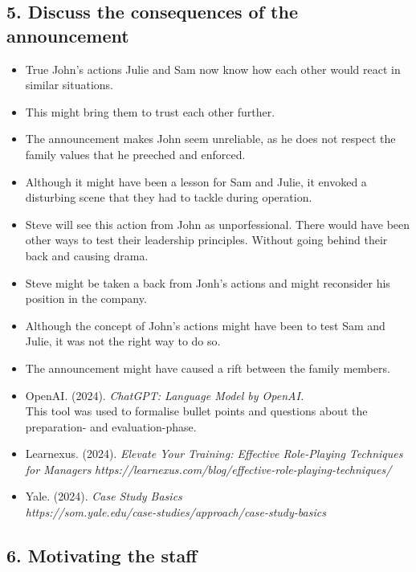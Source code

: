 \documentclass[a4paper,10pt]{article}
\begin{document}
\subsection{5. Discuss the consequences of the announcement}
\begin{itemize}
    \item True John's actions Julie and Sam now know how each other would react in similar situations.
    \item This might bring them to trust each other further.
    \item The announcement makes John seem unreliable, as he does not respect the family values that he preeched and enforced.
    \item Although it might have been a lesson for Sam and Julie, it envoked a disturbing scene that they had to tackle during operation.
    \item Steve will see this action from John as unporfessional. There would have been other ways to test their leadership principles. Without going behind their back and causing drama.
    \item Steve might be taken a back from Jonh's actions and might reconsider his position in the company.
    \item Although the concept of John's actions might have been to test Sam and Julie, it was not the right way to do so.
    \item The announcement might have caused a rift between the family members.
\end{itemize}

\begin{itemize}
    \item OpenAI. (2024). \textit{ChatGPT: Language Model by OpenAI.} \\ 
    This tool was used to formalise bullet points and questions about the preparation- and evaluation-phase.
    \item Learnexus. (2024). \textit{Elevate Your Training: Effective Role-Playing Techniques for Managers} \textit{https://learnexus.com/blog/effective-role-playing-techniques/}
    \item Yale. (2024). \textit{Case Study Basics} \\ \textit{https://som.yale.edu/case-studies/approach/case-study-basics}
\end{itemize}

\subsection{6. Motivating the staff}
\end{document}
